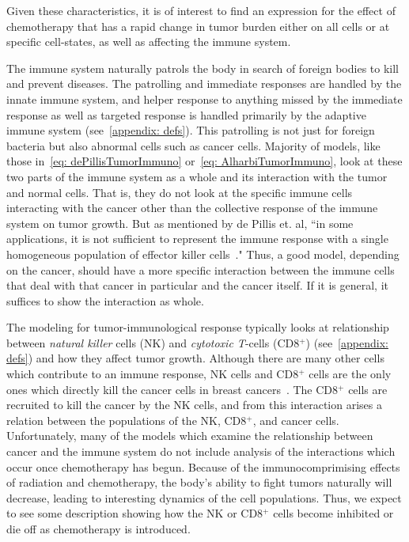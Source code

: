 \documentclass[11pt]{amsart}
\begin{document}
Given these characteristics, it is of interest to find an expression for the effect of chemotherapy that has a rapid change in tumor burden either on all cells or at specific cell-states, as well as affecting the immune system.

The immune system naturally patrols the body in search of foreign bodies to kill and prevent diseases.
The patrolling and immediate responses are handled %
by the innate immune system, %
 and helper response to anything missed by the immediate response as well as targeted response is handled primarily by the adaptive immune system (see\ \ref{appendix: defs}).
This patrolling is not just for foreign bacteria but also abnormal cells such as cancer cells. 
Majority of models, like those in\ \ref{eq: dePillisTumorImmuno} or\ \ref{eq: AlharbiTumorImmuno}, look at these two parts of the immune system as  a whole and its interaction with the tumor and normal cells.
That is, they do not look at the specific immune cells interacting with the cancer other than the collective response of the immune system on tumor growth.
But as mentioned by de Pillis et. al, ``in some applications, it is not sufficient to represent the immune response with a single homogeneous population of
effector killer cells\ \cite{dePillis2014461}."
Thus, a good model, depending on the cancer, should have a more specific interaction between the immune cells that deal with that cancer in particular and the cancer itself.
If it is general, it suffices to show the interaction as whole.

The modeling for tumor-immunological response typically looks %
 at relationship between \textit{natural killer} cells (NK) and \textit{cytotoxic T}-cells (CD8$^+$) (see\ \ref{appendix: defs}) and how they affect tumor growth.
Although there are many other cells which contribute to an immune response, NK cells and CD8$^+$ cells are the only ones which directly kill the cancer cells in breast cancers\ \cite{Amens21}.
The CD8$^+$ cells are recruited to kill the cancer by the NK cells, and from this interaction arises a relation between the populations of the NK, CD8$^+$, and cancer cells. 
Unfortunately, many of the models which examine the relationship between cancer and the immune system do not include analysis of the interactions which occur once chemotherapy has begun.
Because of the immunocomprimising effects of radiation and chemotherapy, the body's ability to fight tumors naturally will decrease, leading to interesting dynamics of the cell populations.
Thus, we expect to see some description showing how the NK or CD8$^+$ cells become inhibited or die off as chemotherapy is introduced.
\end{document}
